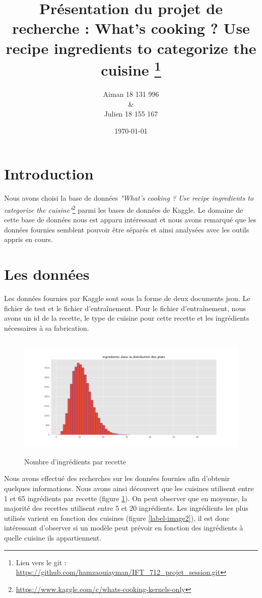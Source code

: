 \documentclass[12pt]{article}
\title{Présentation du projet de recherche : 
What's cooking ? Use recipe ingredients to categorize the cuisine \footnote{ Lien vers le git : \url{https://github.com/hamzaouiayman/IFT\_712\_projet\_session.git}}
}
\author{Aiman \bsc{Hamzaoui} 18 131 996 \\ \& \\ Julien \bsc{Delaunay}  18 155 167}
\date{\today}
\begin{document}
\maketitle
\newpage
\tableofcontents

\newpage
\section{Introduction}
Nous avons choisi la base de données \textit{"What's cooking ? Use recipe ingredients to categorize the cuisine"}\footnote{\url{https://www.kaggle.com/c/whats-cooking-kernels-only}} parmi les bases de données de Kaggle. Le domaine de cette base de données nous est apparu intéressant et nous avons remarqué que les données fournies semblent pouvoir être séparés et ainsi analysées avec les outils appris en cours.

\section{Les données}
Les données fournies par Kaggle sont sous la forme de deux documents json. Le fichier de test et le fichier d'entraînement. Pour le fichier d'entraînement, nous avons un id de la recette, le type de cuisine pour cette recette et les ingrédients nécessaires à sa fabrication. 
\begin{figure}[h]
	\begin{center}
	\includegraphics[width=15cm,height=6cm]{./repartitions_ingredients.png}
	\end{center}
	\caption{Nombre d'ingrédients par recette}
	\label{label-image1}
\end{figure}

Nous avons effectué des recherches sur les données fournies afin d'obtenir quelques informations. Nous avons ainsi découvert que les cuisines utilisent entre 1 et 65 ingrédients par recette (figure \ref{label-image1}). On peut observer que en moyenne, la majorité des recettes utilisent entre 5 et 20 ingrédients. Les ingrédients les plus utilisés varient en fonction des cuisines (figure \ref{label-image2}), il est donc intéressant d'observer si un modèle peut prévoir en fonction des ingrédients à quelle cuisine ils appartiennent.
\end{document}
